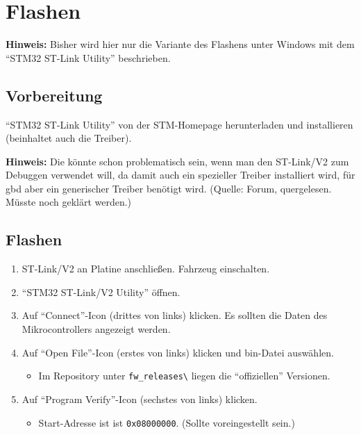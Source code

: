 

\chapter{Flashen}


\textbf{Hinweis:} Bisher wird hier nur die Variante des Flashens unter Windows mit dem "`STM32 ST-Link Utility"' beschrieben.

\section{Vorbereitung}

"`STM32 ST-Link Utility"' von der STM-Homepage herunterladen und installieren (beinhaltet auch die Treiber). 

\textbf{Hinweis:} Die könnte schon problematisch sein, wenn man den ST-Link/V2 zum Debuggen verwendet will, da damit auch ein spezieller Treiber installiert wird, für gbd aber ein generischer Treiber benötigt wird. (Quelle: Forum, quergelesen. Müsste noch geklärt werden.)



\section{Flashen}

\begin{enumerate}
	\item ST-Link/V2 an Platine anschließen. Fahrzeug einschalten.
	\item "`STM32 ST-Link/V2 Utility"' öffnen.
	\item Auf "`Connect"'-Icon (drittes von links) klicken. Es sollten die Daten des Mikrocontrollers angezeigt werden.
	\item Auf "`Open File"'-Icon (erstes von links) klicken und bin-Datei auswählen.
		\begin{itemize}
			\item Im Repository unter \verb|fw_releases\| liegen die "`offiziellen"' Versionen.
		\end{itemize}
	\item Auf "`Program Verify"'-Icon (sechstes von links) klicken.
		\begin{itemize}
			\item Start-Adresse ist ist \verb|0x08000000|. (Sollte voreingestellt sein.)
		\end{itemize}
\end{enumerate}



